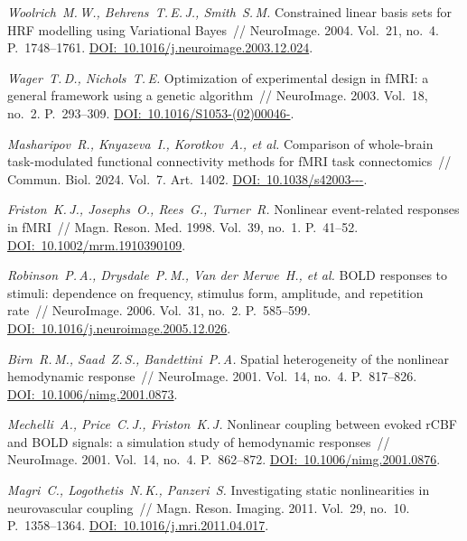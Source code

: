 \begin{ltrtr}
	\textit{Woolrich~M.\,W., Behrens~T.\,E.\,J., Smith~S.\,M.} Constrained linear basis sets for HRF modelling using Variational Bayes~// NeuroImage. 2004. Vol.~21, no.~4. P.~1748--1761. \href{https://doi.org/10.1016/j.neuroimage.2003.12.024}{DOI:~10.1016/\allowbreak j.neuroimage.2003.12.024}.

	\textit{Wager~T.\,D., Nichols~T.\,E.} Optimization of experimental design in fMRI: a general framework using a genetic algorithm~// NeuroImage. 2003. Vol.~18, no.~2. P.~293--309. \href{https://doi.org/10.1016/S1053-8119(02)00046-0}{DOI:~10.1016/\allowbreak S1053-(02)00046-}.

	\textit{Masharipov~R., Knyazeva~I., Korotkov~A., et al.} Comparison of whole-brain task-modulated functional connectivity methods for fMRI task connectomics~// Commun. Biol. 2024. Vol.~7. Art.~1402. \href{https://doi.org/10.1038/s42003-024-07088-3}{DOI:~10.1038/\allowbreak s42003---}.

	\textit{Friston~K.\,J., Josephs~O., Rees~G., Turner~R.} Nonlinear event-related responses in fMRI~// Magn. Reson. Med. 1998. Vol.~39, no.~1. P.~41--52. \href{https://doi.org/10.1002/mrm.1910390109}{DOI:~10.1002/\allowbreak mrm.1910390109}.

	\textit{Robinson~P.\,A., Drysdale~P.\,M., Van der Merwe~H., et al.} BOLD responses to stimuli: dependence on frequency, stimulus form, amplitude, and repetition rate~// NeuroImage. 2006. Vol.~31, no.~2. P.~585--599. \href{https://doi.org/10.1016/j.neuroimage.2005.12.026}{DOI:~10.1016/\allowbreak j.neuroimage.2005.12.026}.

	\textit{Birn~R.\,M., Saad~Z.\,S., Bandettini~P.\,A.} Spatial heterogeneity of the nonlinear hemodynamic response~// NeuroImage. 2001. Vol.~14, no.~4. P.~817--826. \href{https://doi.org/10.1006/nimg.2001.0873}{DOI:~10.1006/\allowbreak nimg.2001.0873}.

	\textit{Mechelli~A., Price~C.\,J., Friston~K.\,J.} Nonlinear coupling between evoked rCBF and BOLD signals: a simulation study of hemodynamic responses~// NeuroImage. 2001. Vol.~14, no.~4. P.~862--872. \href{https://doi.org/10.1006/nimg.2001.0876}{DOI:~10.1006/\allowbreak nimg.2001.0876}.

	\textit{Magri~C., Logothetis~N.\,K., Panzeri~S.} Investigating static nonlinearities in neurovascular coupling~// Magn. Reson. Imaging. 2011. Vol.~29, no.~10. P.~1358--1364. \href{https://doi.org/10.1016/j.mri.2011.04.017}{DOI:~10.1016/\allowbreak j.mri.2011.04.017}.


\end{ltrtr}
